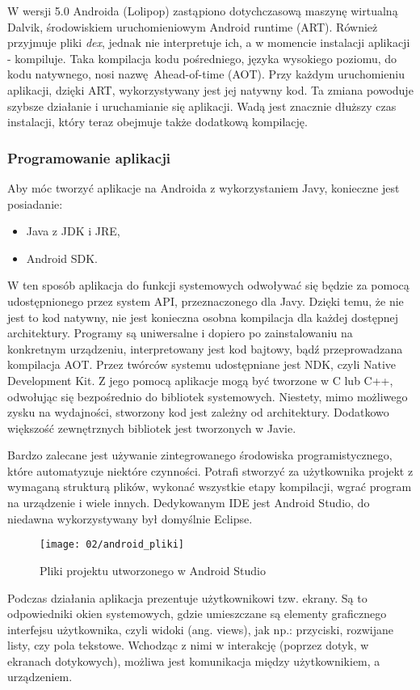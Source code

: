 W wersji 5.0 Androida (Lolipop) zastąpiono dotychczasową maszynę wirtualną Dalvik, środowiskiem uruchomieniowym Android runtime (ART). Również przyjmuje pliki \textit{dex}, jednak nie interpretuje ich, a w momencie instalacji aplikacji - kompiluje. Taka kompilacja kodu pośredniego, języka wysokiego poziomu, do kodu natywnego, nosi nazwę Ahead-of-time (AOT). Przy każdym uruchomieniu aplikacji, dzięki ART, wykorzystywany jest jej natywny kod. Ta zmiana powoduje szybsze działanie i uruchamianie się aplikacji. Wadą jest znacznie dłuższy czas instalacji, który teraz obejmuje także dodatkową kompilację.


\subsubsection*{Programowanie aplikacji}
Aby móc tworzyć aplikacje na Androida z wykorzystaniem Javy, konieczne jest posiadanie:
\begin{itemize}
	\item Java z JDK i JRE,
	\item Android SDK.
\end{itemize}
W ten sposób aplikacja do funkcji systemowych odwoływać się będzie za pomocą udostępnionego przez system API, przeznaczonego dla Javy. Dzięki temu, że nie jest to kod natywny, nie jest konieczna osobna kompilacja dla każdej dostępnej architektury. Programy są uniwersalne i dopiero po zainstalowaniu na konkretnym urządzeniu, interpretowany jest kod bajtowy, bądź przeprowadzana kompilacja AOT. Przez twórców systemu udostępniane jest NDK, czyli Native Development Kit. Z jego pomocą aplikacje mogą być tworzone w C lub C++, odwołując się bezpośrednio do bibliotek systemowych. Niestety, mimo możliwego zysku na wydajności, stworzony kod jest zależny od architektury. Dodatkowo większość zewnętrznych bibliotek jest tworzonych w Javie. 

Bardzo zalecane jest używanie zintegrowanego środowiska programistycznego, które automatyzuje niektóre czynności. Potrafi stworzyć za użytkownika projekt z wymaganą strukturą plików, wykonać wszystkie etapy kompilacji, wgrać program na urządzenie i wiele innych. Dedykowanym IDE jest Android Studio, do niedawna wykorzystywany był domyślnie Eclipse.

\begin{figure}[h]
	\begin{center}
		\texttt{[image: 02/android\_pliki]}
	\end{center}
	\caption{Pliki projektu utworzonego w Android Studio}
	\vspace{-0.3cm}
\end{figure}
Podczas działania aplikacja prezentuje użytkownikowi tzw. ekrany. Są to odpowiedniki okien systemowych, gdzie umieszczane są elementy graficznego interfejsu użytkownika, czyli widoki (ang. views), jak np.: przyciski, rozwijane listy, czy pola tekstowe. Wchodząc z nimi w interakcję (poprzez dotyk, w ekranach dotykowych), możliwa jest komunikacja między użytkownikiem, a urządzeniem. 

